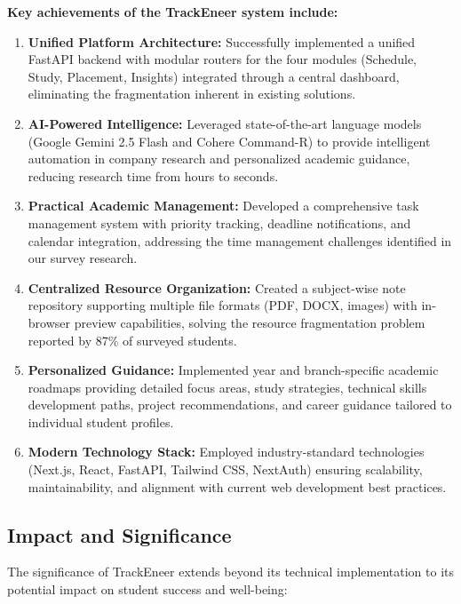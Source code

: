 \documentclass[12pt]{article}
\begin{document}
\textbf{Key achievements of the TrackEneer system include:}

\begin{enumerate}
    \item \textbf{Unified Platform Architecture:} Successfully implemented a unified FastAPI backend with modular routers for the four modules (Schedule, Study, Placement, Insights) integrated through a central dashboard, eliminating the fragmentation inherent in existing solutions.
    
    \item \textbf{AI-Powered Intelligence:} Leveraged state-of-the-art language models (Google Gemini 2.5 Flash and Cohere Command-R) to provide intelligent automation in company research and personalized academic guidance, reducing research time from hours to seconds.
    
    \item \textbf{Practical Academic Management:} Developed a comprehensive task management system with priority tracking, deadline notifications, and calendar integration, addressing the time management challenges identified in our survey research.
    
    \item \textbf{Centralized Resource Organization:} Created a subject-wise note repository supporting multiple file formats (PDF, DOCX, images) with in-browser preview capabilities, solving the resource fragmentation problem reported by 87\% of surveyed students.
    
    \item \textbf{Personalized Guidance:} Implemented year and branch-specific academic roadmaps providing detailed focus areas, study strategies, technical skills development paths, project recommendations, and career guidance tailored to individual student profiles.
    
    \item \textbf{Modern Technology Stack:} Employed industry-standard technologies (Next.js, React, FastAPI, Tailwind CSS, NextAuth) ensuring scalability, maintainability, and alignment with current web development best practices.
\end{enumerate}

\subsection{Impact and Significance}
The significance of TrackEneer extends beyond its technical implementation to its potential impact on student success and well-being:
\end{document}
